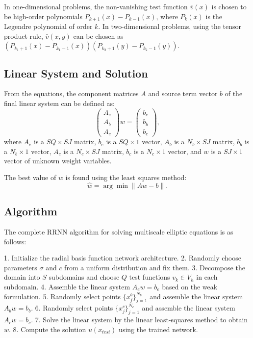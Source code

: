 \documentclass[11pt]{article}
\begin{document}
In one-dimensional problems, the non-vanishing test function $\bar{v}(x)$ is chosen to be high-order polynomials $P_{k+1}(x) - P_{k-1}(x)$, where $P_k(x)$ is the Legendre polynomial of order $k$. In two-dimensional problems, using the tensor product rule, $\bar{v}(x, y)$ can be chosen as $(P_{k_1+1}(x) - P_{k_1-1}(x))(P_{k_2+1}(y) - P_{k_2-1}(y))$.

\subsection{Linear System and Solution}

From the equations, the component matrices $A$ and source term vector $b$ of the final linear system can be defined as:
\begin{equation}
\begin{pmatrix}
A_e \\
A_b \\
A_c
\end{pmatrix}
w =
\begin{pmatrix}
b_e \\
b_b \\
b_c
\end{pmatrix},
\end{equation}
where $A_e$ is a $SQ \times SJ$ matrix, $b_e$ is a $SQ \times 1$ vector, $A_b$ is a $N_b \times SJ$ matrix, $b_b$ is a $N_b \times 1$ vector, $A_c$ is a $N_c \times SJ$ matrix, $b_c$ is a $N_c \times 1$ vector, and $w$ is a $SJ \times 1$ vector of unknown weight variables.

The best value of $w$ is found using the least squares method:
\begin{equation}
\hat{w} = \arg\min \|Aw - b\|.
\end{equation}

\subsection{Algorithm}

The complete RRNN algorithm for solving multiscale elliptic equations is as follows:

1. Initialize the radial basis function network architecture.
2. Randomly choose parameters $\sigma$ and $c$ from a uniform distribution and fix them.
3. Decompose the domain into $S$ subdomains and choose $Q$ test functions $v_k \in V_h$ in each subdomain.
4. Assemble the linear system $A_e w = b_e$ based on the weak formulation.
5. Randomly select points $\{x_j^b\}_{j=1}^{N_b}$ and assemble the linear system $A_b w = b_b$.
6. Randomly select points $\{x_j^c\}_{j=1}^{N_c}$ and assemble the linear system $A_c w = b_c$.
7. Solve the linear system by the linear least-squares method to obtain $w$.
8. Compute the solution $u(x_{test})$ using the trained network.
\end{document}
